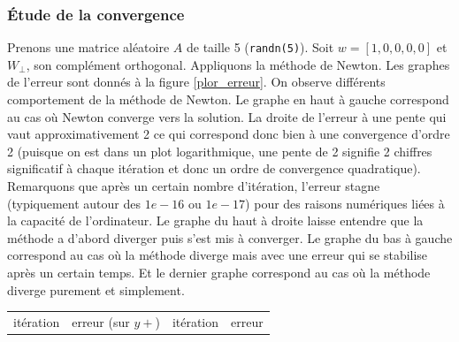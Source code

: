 \subsubsection*{Étude de la convergence}
Prenons une matrice aléatoire $A$ de taille 5 (\texttt{randn(5)}). Soit $w=[1,0,0,0,0]$ et $W_{\bot}$, son complément orthogonal. Appliquons la méthode de Newton. Les graphes de l'erreur sont donnés à la figure \ref{plor_erreur}. On observe différents comportement de la méthode de Newton. Le graphe en haut à gauche correspond au cas où Newton converge vers la solution. La droite de l'erreur à une pente qui vaut approximativement 2 ce qui correspond donc bien à une convergence d'ordre 2 (puisque on est dans un plot logarithmique, une pente de 2 signifie 2 chiffres significatif à chaque itération et donc un ordre de convergence quadratique). Remarquons que après un certain nombre d'itération, l'erreur stagne (typiquement autour des $1e-16$ ou $1e-17$) pour des raisons numériques liées à la capacité de l'ordinateur. Le graphe du haut à droite laisse entendre que la méthode a d'abord diverger puis s'est mis à converger. Le graphe du bas à gauche correspond au cas où la méthode diverge mais avec une erreur qui se stabilise après un certain temps. Et le dernier graphe correspond au cas où la méthode diverge purement et simplement.
\begin{table}
\centering
\begin{tabular}{cccc}
itération & erreur (sur $y+$) & itération & erreur\\
\end{tabular}
\end{table}  

